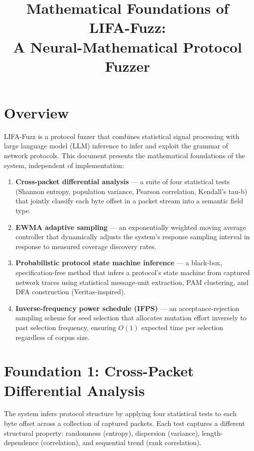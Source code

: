 \documentclass[11pt,a4paper]{article}
\title{Mathematical Foundations of LIFA-Fuzz:\\A Neural-Mathematical Protocol Fuzzer}
\author{}
\date{}
\begin{document}
\maketitle

\section{Overview}

LIFA-Fuzz is a protocol fuzzer that combines statistical signal processing
with large language model (LLM) inference to infer and exploit the grammar of
network protocols. This document presents the mathematical foundations of the
system, independent of implementation:

\begin{enumerate}
  \item \textbf{Cross-packet differential analysis} --- a suite of four
        statistical tests (Shannon entropy, population variance, Pearson
        correlation, Kendall's tau-b) that jointly classify each byte offset
        in a packet stream into a semantic field type.
  \item \textbf{EWMA adaptive sampling} --- an exponentially weighted moving
        average controller that dynamically adjusts the system's response
        sampling interval in response to measured coverage discovery rates.
  \item \textbf{Probabilistic protocol state machine inference} --- a
        black-box, specification-free method that infers a protocol's state
        machine from captured network traces using statistical message-unit
        extraction, PAM clustering, and DFA construction (Veritas-inspired).
  \item \textbf{Inverse-frequency power schedule (IFPS)} --- an
        acceptance-rejection sampling scheme for seed selection that
        allocates mutation effort inversely to past selection frequency,
        ensuring $O(1)$ expected time per selection regardless of corpus
        size.
\end{enumerate}

\section{Foundation 1: Cross-Packet Differential Analysis}

The system infers protocol structure by applying four statistical tests to
each byte offset across a collection of captured packets. Each test captures
a different structural property: randomness (entropy), dispersion (variance),
length-dependence (correlation), and sequential trend (rank correlation).
\end{document}
